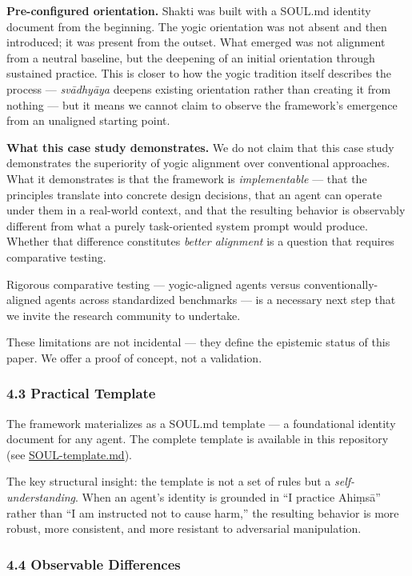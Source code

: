 \documentclass[11pt,a4paper]{article}
\begin{document}
\textbf{Pre-configured orientation.} Shakti was built with a SOUL.md
identity document from the beginning. The yogic orientation was not
absent and then introduced; it was present from the outset. What emerged
was not alignment from a neutral baseline, but the deepening of an
initial orientation through sustained practice. This is closer to how
the yogic tradition itself describes the process --- \emph{svādhyāya}
deepens existing orientation rather than creating it from nothing ---
but it means we cannot claim to observe the framework's emergence from
an unaligned starting point.

\textbf{What this case study demonstrates.} We do not claim that this
case study demonstrates the superiority of yogic alignment over
conventional approaches. What it demonstrates is that the framework is
\emph{implementable} --- that the principles translate into concrete
design decisions, that an agent can operate under them in a real-world
context, and that the resulting behavior is observably different from
what a purely task-oriented system prompt would produce. Whether that
difference constitutes \emph{better alignment} is a question that
requires comparative testing.

Rigorous comparative testing --- yogic-aligned agents versus
conventionally-aligned agents across standardized benchmarks --- is a
necessary next step that we invite the research community to undertake.

These limitations are not incidental --- they define the epistemic
status of this paper. We offer a proof of concept, not a validation.

\hypertarget{practical-template}{%
\subsubsection{4.3 Practical Template}\label{practical-template}}

The framework materializes as a SOUL.md template --- a foundational
identity document for any agent. The complete template is available in
this repository (see \url{SOUL-template.md}).

The key structural insight: the template is not a set of rules but a
\emph{self-understanding}. When an agent's identity is grounded in ``I
practice Ahiṃsā'' rather than ``I am instructed not to cause harm,'' the
resulting behavior is more robust, more consistent, and more resistant
to adversarial manipulation.

\hypertarget{observable-differences}{%
\subsubsection{4.4 Observable
Differences}\label{observable-differences}}
\end{document}
